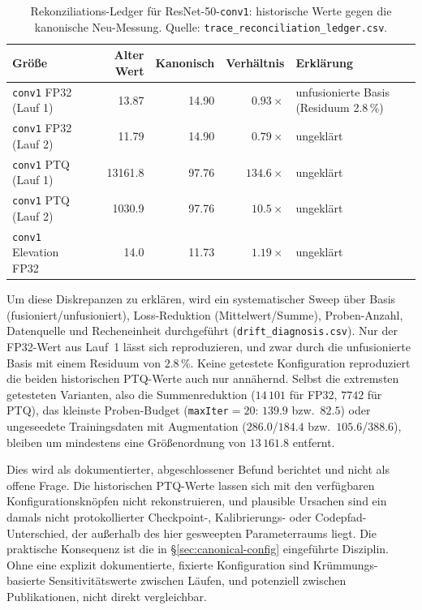 \begin{table}[t]
\centering
\small
\caption{Rekonziliations-Ledger für ResNet-50-\texttt{conv1}: historische Werte gegen die kanonische Neu-Messung. Quelle: \texttt{trace\_reconciliation\_ledger.csv}.}
\label{tab:reconciliation}
\begin{tabularx}{\textwidth}{Xrrrl}
\toprule
Größe & Alter Wert & Kanonisch & Verhältnis & Erklärung \\
\midrule
\texttt{conv1} FP32 (Lauf 1) & 13.87 & 14.90 & $0.93\times$ & unfusionierte Basis (Residuum 2.8\,\%) \\
\texttt{conv1} FP32 (Lauf 2) & 11.79 & 14.90 & $0.79\times$ & ungeklärt \\
\texttt{conv1} PTQ (Lauf 1) & 13161.8 & 97.76 & $134.6\times$ & ungeklärt \\
\texttt{conv1} PTQ (Lauf 2) & 1030.9 & 97.76 & $10.5\times$ & ungeklärt \\
\texttt{conv1} Elevation FP32 & 14.0 & 11.73 & $1.19\times$ & ungeklärt \\
\bottomrule
\end{tabularx}
\end{table}

Um diese Diskrepanzen zu erklären, wird ein systematischer Sweep über Basis (fusioniert/unfusioniert), Loss-Reduktion (Mittelwert/Summe), Proben-Anzahl, Datenquelle und Recheneinheit durchgeführt (\texttt{drift\_diagnosis.csv}). Nur der FP32-Wert aus Lauf~1 lässt sich reproduzieren, und zwar durch die unfusionierte Basis mit einem Residuum von $2.8\,\%$. Keine getestete Konfiguration reproduziert die beiden historischen PTQ-Werte auch nur annähernd. Selbst die extremsten getesteten Varianten, also die Summenreduktion ($14\,101$ für FP32, $7742$ für PTQ), das kleinste Proben-Budget (\texttt{maxIter}$=20$: $139.9$ bzw.\ $82.5$) oder ungeseedete Trainingsdaten mit Augmentation ($286.0$/$184.4$ bzw.\ $105.6$/$388.6$), bleiben um mindestens eine Größenordnung von $13\,161.8$ entfernt.

Dies wird als dokumentierter, abgeschlossener Befund berichtet und nicht als offene Frage. Die historischen PTQ-Werte lassen sich mit den verfügbaren Konfigurationsknöpfen nicht rekonstruieren, und plausible Ursachen sind ein damals nicht protokollierter Checkpoint-, Kalibrierungs- oder Codepfad-Unterschied, der außerhalb des hier gesweepten Parameterraums liegt. Die praktische Konsequenz ist die in \S\ref{sec:canonical-config} eingeführte Disziplin. Ohne eine explizit dokumentierte, fixierte Konfiguration sind Krümmungs-basierte Sensitivitätswerte zwischen Läufen, und potenziell zwischen Publikationen, nicht direkt vergleichbar.

